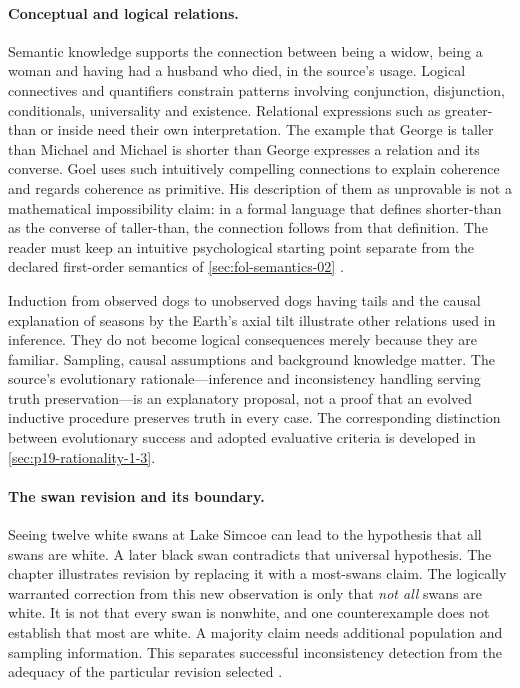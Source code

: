 \paragraph{Conceptual and logical relations.}
Semantic knowledge supports the connection between being a widow, being a
woman and having had a husband who died, in the source's usage. Logical
connectives and quantifiers constrain patterns involving conjunction,
disjunction, conditionals, universality and existence. Relational expressions
such as greater-than or inside need their own interpretation. The example
that George is taller than Michael and Michael is shorter than George
expresses a relation and its converse. Goel uses such intuitively compelling
connections to explain coherence and regards coherence as primitive. His
description of them as unprovable is not a mathematical impossibility claim:
in a formal language that defines shorter-than as the converse of
taller-than, the connection follows from that definition. The reader must
keep an intuitive psychological starting point separate from the declared
first-order semantics of \cref{sec:fol-semantics-02}
\cite[pp.~115--117]{Goel2021RationalityBrain}.

Induction from observed dogs to unobserved dogs having tails and the causal
explanation of seasons by the Earth's axial tilt illustrate other relations
used in inference. They do not become logical consequences merely because
they are familiar. Sampling, causal assumptions and background knowledge
matter. The source's evolutionary rationale---inference and inconsistency
handling serving truth preservation---is an explanatory proposal, not a
proof that an evolved inductive procedure preserves truth in every case.
The corresponding distinction between evolutionary success and adopted
evaluative criteria is developed in \cref{sec:p19-rationality-1-3}.

\paragraph{The swan revision and its boundary.}
Seeing twelve white swans at Lake Simcoe can lead to the hypothesis that
all swans are white. A later black swan contradicts that universal
hypothesis. The chapter illustrates revision by replacing it with a
most-swans claim. The logically warranted correction from this new
observation is only that \emph{not all} swans are white. It is not that
every swan is nonwhite, and one counterexample does not establish that
most are white. A majority claim needs additional population and sampling
information. This separates successful inconsistency detection from the
adequacy of the particular revision selected
\cite[p.~116]{Goel2021RationalityBrain}.

